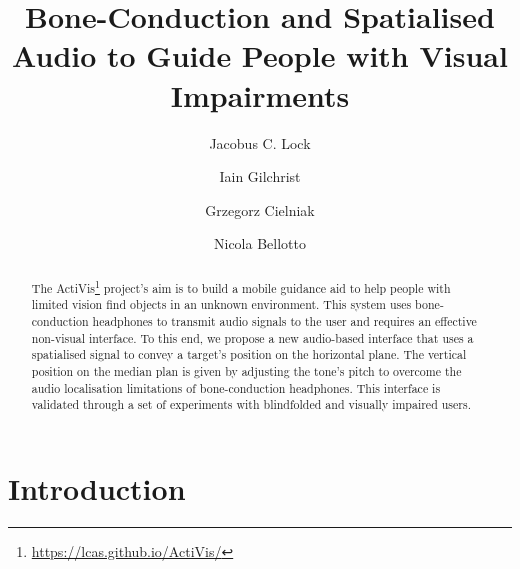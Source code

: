 \documentclass{llncs}
\begin{document}
\title{Bone-Conduction and Spatialised Audio to Guide People with Visual Impairments}

\author{Jacobus C. Lock \and 
Iain Gilchrist \and
Grzegorz Cielniak \and
Nicola Bellotto}



\maketitle
\setcounter{footnote}{0}

\begin{abstract}
  The ActiVis\footnote{\url{https://lcas.github.io/ActiVis/}} project's aim is to build a mobile guidance aid to help people with limited vision find objects in an unknown environment.
  This system uses bone-conduction headphones to transmit audio signals to the user and requires an effective non-visual interface.
  To this end, we propose a new audio-based interface that uses a spatialised signal to convey a target's position on the horizontal plane. 
  The vertical position on the median plan is given by adjusting the tone's pitch to overcome the audio localisation limitations of bone-conduction headphones. 
  This interface is validated through a set of experiments with blindfolded and visually impaired users. 
\end{abstract} 

\section{Introduction}
\end{document}
